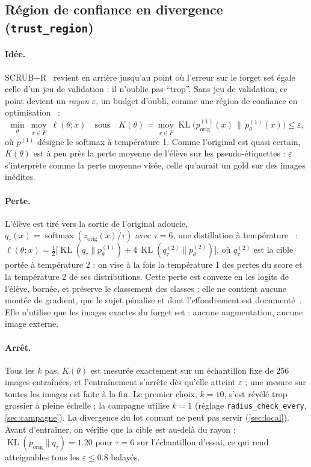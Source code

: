 \documentclass[11pt,a4paper]{article}
\newcommand{\KL}{\operatorname{KL}}
\newcommand{\Exp}{\operatorname*{moy}}
\newcommand{\orig}{\mathrm{orig}}
\newcommand{\code}[1]{\texttt{#1}}
\begin{document}
\subsection{Région de confiance en divergence (\code{trust\_region})}\label{sec:trust}
\paragraph{Idée.} SCRUB+R~\cite{kurmanji2023} revient en arrière jusqu'au point où l'erreur sur le
forget set égale celle d'un jeu de validation : il n'oublie pas \enquote{trop}. Sans jeu de
validation, ce point devient un \emph{rayon} $\varepsilon$, un budget d'oubli, comme une région de
confiance en optimisation~\cite{schulman2015} :
\begin{equation}\label{eq:trust}
  \min_\theta\ \Exp_{x\in F}\ \ell(\theta;x)
  \quad\text{sous}\quad
  K(\theta)=\Exp_{x\in F}\KL\bigl(p^{(1)}_\orig(x)\,\big\|\,p^{(1)}_\theta(x)\bigr)\le\varepsilon,
\end{equation}
où $p^{(1)}$ désigne le softmax à température 1. Comme l'original est quasi certain, $K(\theta)$
est à peu près la perte moyenne de l'élève sur les pseudo-étiquettes : $\varepsilon$ s'interprète
comme la perte moyenne visée, celle qu'aurait un gold sur des images inédites.

\paragraph{Perte.} L'élève est tiré vers la sortie de l'original adoucie,
$q_\tau(x)=\operatorname{softmax}(z_\orig(x)/\tau)$ avec $\tau=6$, une distillation à
température~\cite{hinton2015} : $\ell(\theta;x)=\tfrac12\bigl[\KL(q_\tau\|p^{(1)}_\theta)+
4\,\KL(q_\tau^{(2)}\|p^{(2)}_\theta)\bigr]$, où $q_\tau^{(2)}$ est la cible portée à température 2 :
on vise à la fois la température 1 des pertes du score et la température 2 de ses distributions. Cette perte est convexe en les logits de l'élève, bornée, et
préserve le classement des classes ; elle ne contient aucune montée de gradient, que le sujet
pénalise et dont l'effondrement est documenté~\cite{zhang2024npo}. Elle n'utilise que les images
exactes du forget set : aucune augmentation, aucune image externe.

\paragraph{Arrêt.} Tous les $k$ pas, $K(\theta)$ est mesurée exactement sur un échantillon fixe de
256 images entraînées, et l'entraînement s'arrête dès qu'elle atteint $\varepsilon$ ; une mesure
sur toutes les images est faite à la fin. Le premier choix, $k=10$, s'est révélé trop grossier à
pleine échelle ; la campagne utilise $k=1$ (réglage \code{radius\_check\_every},
\cref{sec:campagne}). La divergence du lot courant ne peut pas servir
(\cref{sec:local}). Avant d'entraîner, on vérifie que la cible est au-delà du rayon :
$\KL(p_\orig\|q_\tau)=\num{1.20}$ pour $\tau=6$ sur l'échantillon d'essai, ce qui rend atteignables
tous les $\varepsilon\le\num{0.8}$ balayés.
\end{document}
